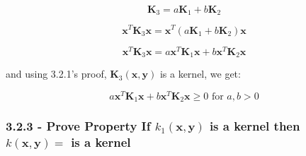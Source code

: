 \documentclass[10pt]{article}
\begin{document}
\[
\textbf{K}_{3} = a \textbf{K}_{1} + b  \textbf{K}_{2}
\]

\[
\textbf{x}^{T} \textbf{K}_3 \textbf{x} = \textbf{x}^{T} ( a \textbf{K}_{1} + b  \textbf{K}_{2}) \textbf{x}
\]

\[
\textbf{x}^{T} \textbf{K}_3 \textbf{x} = a \textbf{x}^{T} \textbf{K}_1 \textbf{x} + b \textbf{x}^{T} \textbf{K}_2 \textbf{x}
\]

and using 3.2.1's proof, $\textbf{K}_{3}(\textbf{x},\textbf{y})$ is a kernel, we get: 

\[
a \textbf{x}^{T} \textbf{K}_1 \textbf{x} + b \textbf{x}^{T} \textbf{K}_2 \textbf{x} \geq 0 \text{ for } a,b > 0
\]


\subsubsection{3.2.3 - Prove Property If $k_1(\textbf{x},\textbf{y})$ is a kernel then $k(\textbf{x},\textbf{y}) = $ is a kernel}



\pagebreak
\end{document}
